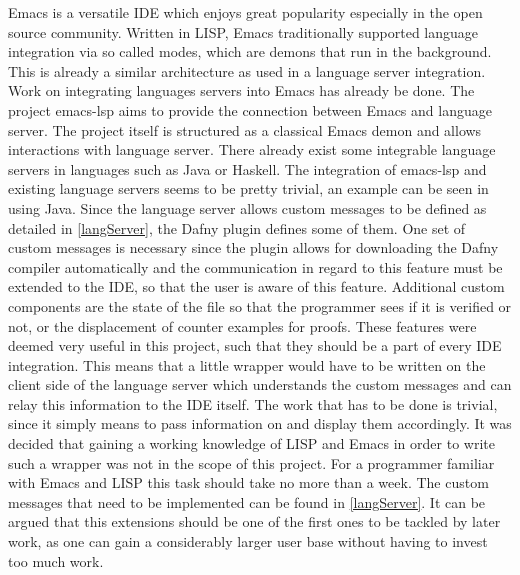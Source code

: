 Emacs \cite{GNU} is a versatile IDE which enjoys great popularity especially in the open source community. Written in LISP, Emacs traditionally supported language integration via so called modes, which are demons that run in the background. This is already a similar architecture as used in a language server integration. \newline
Work on integrating languages servers into Emacs has already be done. The project emacs-lsp \cite{emacsLsp} aims to provide the connection between Emacs and language server. The project itself is structured as a classical Emacs demon and allows interactions with language server. There already exist some integrable language servers in languages such as Java or Haskell. The integration of emacs-lsp and existing language servers seems to be pretty trivial, an example can be seen in \cite{javaEmacs} using Java. \newline
Since the language server allows custom messages to be defined as detailed in \ref{langServer}, the Dafny plugin defines some of them. One set of custom messages is necessary since the plugin allows for downloading the Dafny compiler automatically and the communication in regard to this feature must be extended to the IDE, so that the user is aware of this feature. Additional custom components are the state of the file so that the programmer sees if it is verified or not, or the displacement of counter examples for proofs.\newline
These features were deemed very useful in this project, such that they should be a part of every IDE integration. This means that a little wrapper would have to be written on the client side of the language server which understands the custom messages and can relay this information to the IDE itself. The work that has to be done is trivial, since it simply means to pass information on and display them accordingly. \newline
It was decided that gaining a working knowledge of LISP and Emacs in order to write such a wrapper was not in the scope of this project. For a programmer familiar with Emacs and LISP this task should take no more than a week. The custom messages that need to be implemented can be found in  \ref{langServer}. It can be argued that this extensions should be one of the first ones to be tackled by later work, as one can gain a considerably larger user base without having to invest too much work. \newline

